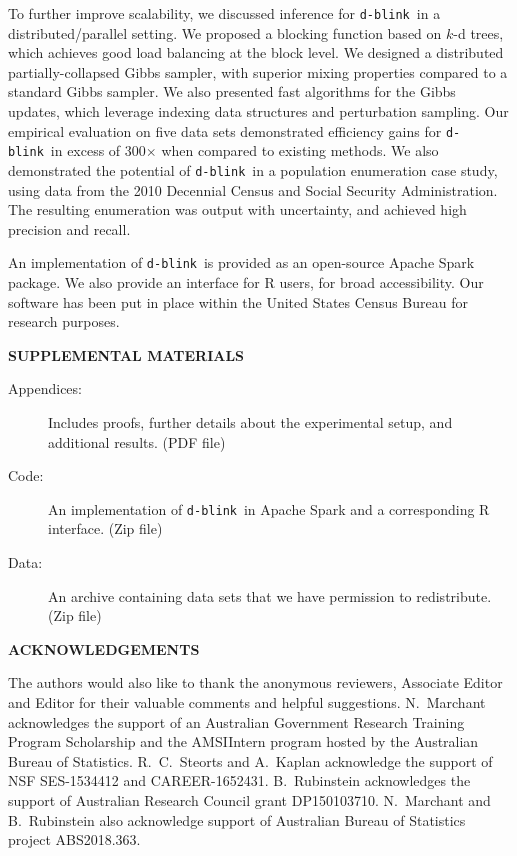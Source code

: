 \documentclass[12pt,letterpaper]{article}
\newcommand{\1}[1]{\mathbb{I}\!\left[#1\right]} %
\newcommand{\dblink}{\texttt{\upshape \lowercase{d-blink}}} %
\begin{document}
To further improve scalability, we discussed inference for 
\dblink\ in a distributed\slash parallel setting.
We proposed a blocking function based on $k$-d trees, which achieves 
good load balancing at the block level.  
We designed a distributed partially-collapsed Gibbs sampler, 
with superior mixing properties compared to a standard Gibbs sampler. 
We also presented fast algorithms for the Gibbs updates, which 
leverage indexing data structures and perturbation sampling. 
Our empirical evaluation on five data sets demonstrated efficiency 
gains for \dblink\ in excess of 300$\times$ when compared to existing 
methods.
We also demonstrated the potential of \dblink\ in a population 
enumeration case study, using data from the 2010 Decennial 
Census and Social Security Administration. 
The resulting enumeration was output with uncertainty, and achieved 
high precision and recall. 

An implementation of \dblink\ is provided as an open-source Apache Spark 
package. 
We also provide an interface for R users, for broad accessibility. 
Our software has been put in place within the United States Census 
Bureau for research purposes.

\bigskip
\begin{center}
{\large\bf SUPPLEMENTAL MATERIALS}
\end{center}

\begin{description}

\item[Appendices:] Includes proofs, further details about the 
experimental setup, and additional results. (PDF file)

\item[Code:] An implementation of \dblink\ in Apache Spark 
and a corresponding R interface. (Zip file)

\item[Data:] An archive containing data sets that we have permission to 
redistribute. (Zip file)

\end{description}

\bigskip
\begin{center}
{\large\bf ACKNOWLEDGEMENTS}
\end{center}
The authors would also like to thank the anonymous reviewers, Associate 
Editor and Editor for their valuable comments and helpful suggestions. 
N.~Marchant acknowledges the support of an Australian Government 
Research Training Program Scholarship and the AMSIIntern program
hosted by the Australian Bureau of Statistics. 
R.~C.~Steorts and A.~Kaplan acknowledge the support of NSF SES-1534412 and 
CAREER-1652431.
B.~Rubinstein acknowledges the support of Australian Research Council grant 
DP150103710.
N.~Marchant and B.~Rubinstein also acknowledge support of Australian Bureau 
of Statistics project ABS2018.363.


{
\footnotesize

}
\end{document}
